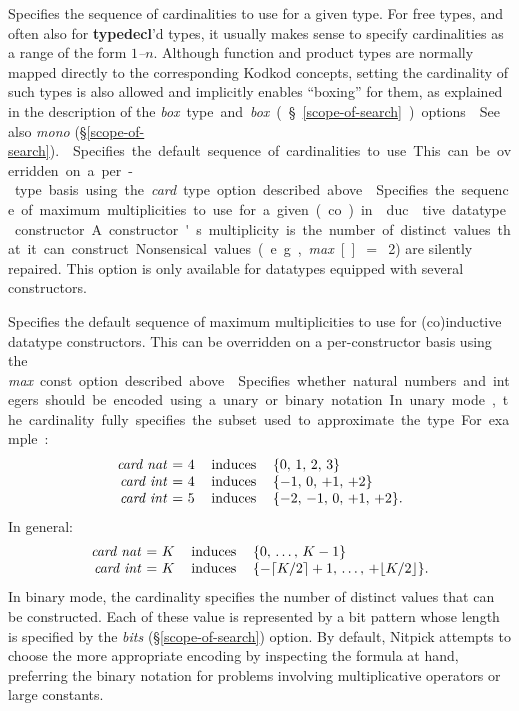 \documentclass[a4paper,12pt]{article}
\begin{document}
\begin{enum}
Specifies the sequence of cardinalities to use for a given type.
For free types, and often also for \textbf{typedecl}'d types, it usually makes
sense to specify cardinalities as a range of the form \textit{$1$--$n$}.
Although function and product types are normally mapped directly to the
corresponding Kodkod concepts, setting
the cardinality of such types is also allowed and implicitly enables ``boxing''
for them, as explained in the description of the \textit{box}~\qty{type}
and \textit{box} (\S\ref{scope-of-search}) options.

\nopagebreak
{\small See also \textit{mono} (\S\ref{scope-of-search}).}

Specifies the default sequence of cardinalities to use. This can be overridden
on a per-type basis using the \textit{card}~\qty{type} option described above.

Specifies the sequence of maximum multiplicities to use for a given
(co)in\-duc\-tive datatype constructor. A constructor's multiplicity is the
number of distinct values that it can construct. Nonsensical values (e.g.,
\textit{max}~[]~$=$~2) are silently repaired. This option is only available for
datatypes equipped with several constructors.

Specifies the default sequence of maximum multiplicities to use for
(co)in\-duc\-tive datatype constructors. This can be overridden on a per-constructor
basis using the \textit{max}~\qty{const} option described above.

Specifies whether natural numbers and integers should be encoded using a unary
or binary notation. In unary mode, the cardinality fully specifies the subset
used to approximate the type. For example:
%
$$\hbox{\begin{tabular}{@{}rll@{}}%
\textit{card nat} = 4 & induces & $\{0,\, 1,\, 2,\, 3\}$ \\
\textit{card int} = 4 & induces & $\{-1,\, 0,\, +1,\, +2\}$ \\
\textit{card int} = 5 & induces & $\{-2,\, -1,\, 0,\, +1,\, +2\}.$%
\end{tabular}}$$
%
In general:
%
$$\hbox{\begin{tabular}{@{}rll@{}}%
\textit{card nat} = $K$ & induces & $\{0,\, \ldots,\, K - 1\}$ \\
\textit{card int} = $K$ & induces & $\{-\lceil K/2 \rceil + 1,\, \ldots,\, +\lfloor K/2 \rfloor\}.$%
\end{tabular}}$$
%
In binary mode, the cardinality specifies the number of distinct values that can
be constructed. Each of these value is represented by a bit pattern whose length
is specified by the \textit{bits} (\S\ref{scope-of-search}) option. By default,
Nitpick attempts to choose the more appropriate encoding by inspecting the
formula at hand, preferring the binary notation for problems involving
multiplicative operators or large constants.


\end{enum}
\end{document}

